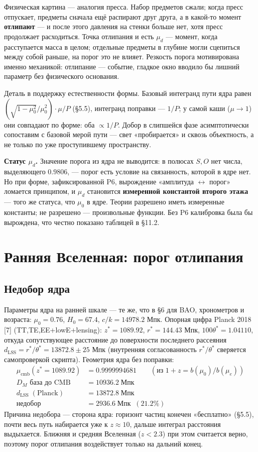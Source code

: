 \documentclass{article}
\begin{document}
Физическая картина --- аналогия пресса. Набор предметов сжали; когда пресс отпускает, предметы сначала ещё распирают друг друга, а в какой-то момент \textbf{отлипают} --- и после этого давления на стенки больше нет, хотя пресс продолжает расходиться. Точка отлипания и есть $\mu_d$ --- момент, когда расступается масса в целом; отдельные предметы в глубине могли сцепиться между собой раньше, на порог это не влияет. Резкость порога мотивирована именно механикой: отлипание --- событие, гладкое окно вводило бы лишний параметр без физического основания.

Деталь в поддержку естественности формы. Базовый интегранд пути ядра равен $(\sqrt{1-\mu_0^2}/\mu_0^2)\cdot\mu/P$ (\S5.5), интегранд поправки --- $1/P$; у самой каши ($\mu \to 1$) они совпадают по форме: оба $\propto 1/P$. Добор в слипшейся фазе асимптотически сопоставим с базовой мерой пути --- свет «пробирается» и сквозь объектность, а не только по уже проступившему пространству.

\medskip
\noindent\textbf{Статус $\mu_d$.} Значение порога из ядра не выводится: в полюсах $S, O$ нет числа, выделяющего $0.9806$, --- порог есть условие на связанность, которой в ядре нет. Но при форме, зафиксированной P6, вырождение «амплитуда $\leftrightarrow$ порог» ломается принципом, и $\mu_d$ становится \textbf{измеренной константой второго этажа} --- того же статуса, что $\mu_0$ в ядре. Теории разрешено иметь измеренные константы; не разрешено --- произвольные функции. Без P6 калибровка была бы вырождена, что честно показано таблицей в \S11.2.
\section{Ранняя Вселенная: порог отлипания}

\subsection{Недобор ядра}

Параметры ядра на ранней шкале --- те же, что в \S6 для BAO, хронометров и возраста: $\mu_0 = 0.76$, $H_0 = 67.4$, $c/k = 14978.2$ Мпк. Опорная цифра Planck 2018 [7] (TT,TE,EE+lowE+lensing): $z^* = 1089.92$, $r^* = 144.43$ Мпк, $100\theta^* = 1.04110$, откуда сопутствующее расстояние до поверхности последнего рассеяния $d_{\text{LSS}} = r^*/\theta^* = 13872.8 \pm 25$ Мпк (внутренняя согласованность $r^*/\theta^*$ сверяется самопроверкой скрипта). Геометрия ядра без поправки:
\begin{align*}
\mu_{\text{cmb}}(z^* = 1089.92) &= 0.9999994681 \qquad (\text{из } 1+z = b(\mu_0)/b(\mu_e)) \\
D_M \text{ база до CMB} &= 10936.2\;\text{Мпк} \\
d_{\text{LSS}}\;(\text{Planck}) &= 13872.8\;\text{Мпк} \\
\text{недобор} &= 2936.6\;\text{Мпк} \;\;(21.2\%)
\end{align*}
Причина недобора --- сторона ядра: горизонт частиц конечен «бесплатно» (\S5.5), почти весь путь набирается уже к $z \approx 10$, дальше интеграл расстояния выдыхается. Ближняя и средняя Вселенная ($z < 2.3$) при этом считается верно, поэтому порог отлипания воздействует только на дальний конец.
\end{document}
